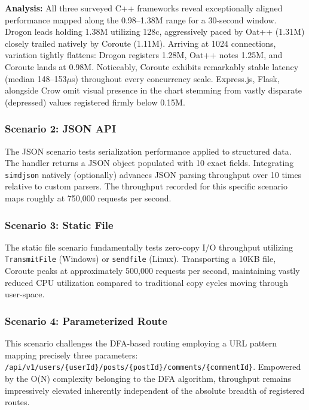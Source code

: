 \textbf{Analysis:} All three surveyed C++ frameworks reveal exceptionally aligned performance mapped along the 0.98--1.38M range for a 30-second window. Drogon leads holding 1.38M utilizing 128c, aggressively paced by Oat++ (1.31M) closely trailed natively by Coroute (1.11M). Arriving at 1024 connections, variation tightly flattens: Drogon registers 1.28M, Oat++ notes 1.25M, and Coroute lands at 0.98M. Noticeably, Coroute exhibits remarkably stable latency (median 148--153$\mu$s) throughout every concurrency scale. Express.js, Flask, alongside Crow omit visual presence in the chart stemming from vastly disparate (depressed) values registered firmly below 0.15M.

\subsubsection{Scenario 2: JSON API}

The JSON scenario tests serialization performance applied to structured data. The handler returns a JSON object populated with 10 exact fields. Integrating \texttt{simdjson} natively (optionally) advances JSON parsing throughput over 10 times relative to custom parsers. The throughput recorded for this specific scenario maps roughly at 750,000 requests per second.

\subsubsection{Scenario 3: Static File}

The static file scenario fundamentally tests zero-copy I/O throughput utilizing \texttt{TransmitFile} (Windows) or \texttt{sendfile} (Linux). Transporting a 10KB file, Coroute peaks at approximately 500,000 requests per second, maintaining vastly reduced CPU utilization compared to traditional copy cycles moving through user-space.

\subsubsection{Scenario 4: Parameterized Route}

This scenario challenges the DFA-based routing employing a URL pattern mapping precisely three parameters: \texttt{/api/v1/users/\{userId\}/posts/\{postId\}/comments/\{commentId\}}. Empowered by the O(N) complexity belonging to the DFA algorithm, throughput remains impressively elevated inherently independent of the absolute breadth of registered routes.


